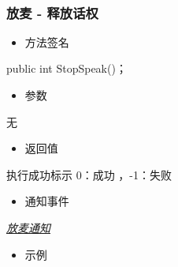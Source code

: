 \documentclass[letterpaper,10pt,english]{sphinxmanual}
\begin{document}
​


\subsubsection{放麦 - 释放话权}
\label{\detokenize{csharp:id48}}\begin{itemize}
\item {} 
方法签名

\end{itemize}

%
\begin{sphinxVerbatim}[commandchars=\\\{\}]
public int StopSpeak()；
\end{sphinxVerbatim}
\begin{itemize}
\item {} 
参数

\end{itemize}

无
\begin{itemize}
\item {} 
返回值

\end{itemize}

执行成功标示 0：成功 ，-1：失败
\begin{itemize}
\item {} 
通知事件

\end{itemize}

{\hyperref[\detokenize{csharp:stopSpaek}]{\emph{放麦通知}}}
\begin{itemize}
\item {} 
示例

\end{itemize}

%
\begin{sphinxVerbatim}[commandchars=\\\{\}]
   
  

     
     
\end{sphinxVerbatim}
\end{document}
